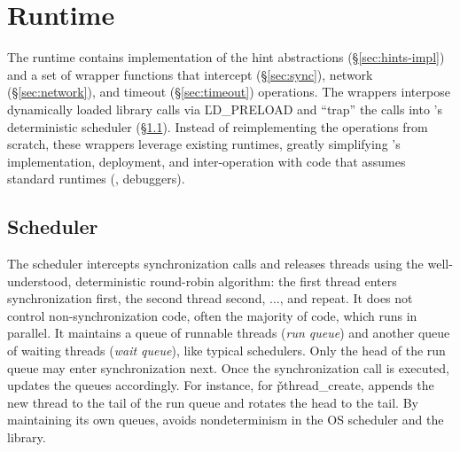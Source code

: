 \section{\xxx Runtime} \label{sec:runtime}


The \xxx runtime contains implementation of the hint abstractions
(\S\ref{sec:hints-impl}) and a set of wrapper functions that intercept
\pthread (\S\ref{sec:sync}), network (\S\ref{sec:network}), and timeout
(\S\ref{sec:timeout}) operations.  The wrappers interpose dynamically
loaded library calls via \v{LD\_PRELOAD} and ``trap'' the calls into
\xxx's deterministic scheduler (\S\ref{sec:scheduler}).  Instead of
reimplementing the operations from scratch, these wrappers leverage
existing runtimes, greatly simplifying \xxx's implementation, deployment,
and inter-operation with code that assumes standard runtimes (\eg,
debuggers).

\subsection{Scheduler} \label{sec:scheduler}

The scheduler intercepts synchronization calls and releases threads using the
well-understood, deterministic round-robin algorithm: the first thread
enters synchronization first, the second thread second, ..., and
repeat.  It does not control non-synchronization code, often the majority
of code, which runs in parallel.  It maintains a queue
of runnable threads (\emph{run queue}) and another queue of waiting
threads (\emph{wait queue}), like typical schedulers.  Only the head of the
run queue may enter synchronization next. Once the synchronization call is
executed, \xxx updates the queues accordingly.  For instance, for
\v{pthread\_create}, \xxx appends the new thread to the tail of
the run queue and rotates the head to the tail.  By maintaining
its own queues, \xxx avoids nondeterminism in the OS scheduler and
the \pthread library.

